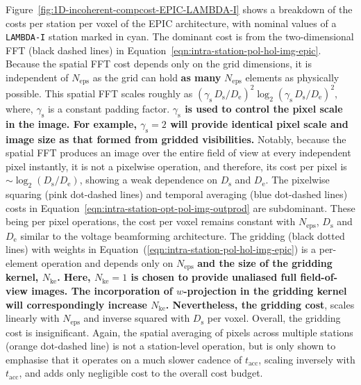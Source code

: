 \documentclass[
  journal=pasa,
  manuscript=article-type,
  year=2020,
  volume=37,
]{cup-journal}
\begin{document}
Figure~\ref{fig:1D-incoherent-compcost-EPIC-LAMBDA-I} shows a breakdown of the costs per station per voxel of the EPIC architecture, with nominal values of a \texttt{LAMBDA-I} station marked in cyan. The dominant cost is from the two-dimensional FFT (black dashed lines) in Equation~\ref{eqn:intra-station-pol-hol-img-epic}.
Because the spatial FFT cost depends only on the grid dimensions, it is independent of $N_\textrm{eps}$ as the grid can hold \textbf{as many} $N_\textrm{eps}$ elements as physically possible. This spatial FFT scales roughly as $(\gamma_\textrm{s} \, D_\textrm{s}/D_\textrm{e})^2\log_2(\gamma_\textrm{s}\, D_\textrm{s}/D_\textrm{e})^2$, where, $\gamma_\textrm{s}$ is a constant padding factor. \textbf{$\gamma_\textrm{s}$ is used to control the pixel scale in the image. For example, $\gamma_\textrm{s}=2$ will provide identical pixel scale and image size as that formed from gridded visibilities.} Notably, because the spatial FFT produces an image over the entire field of view at every independent pixel instantly, it is not a pixelwise operation, and therefore, its cost per pixel is $\sim \log_2(D_\textrm{s}/D_\textrm{e})$, showing a weak dependence on $D_\textrm{s}$ and $D_\textrm{e}$. The pixelwise squaring (pink dot-dashed lines) and temporal averaging (blue dot-dashed lines) costs in Equation~\ref{eqn:intra-station-opt-pol-img-outprod}
are subdominant. These being per pixel operations, the cost per voxel remains constant with $N_\textrm{eps}$, $D_\textrm{s}$ and $D_\textrm{e}$ similar to the voltage beamforming architecture. The gridding (black dotted lines) with weights in Equation~(\ref{eqn:intra-station-pol-hol-img-epic})
is a per-element operation and depends only on $N_\textrm{eps}$ \textbf{and the size of the gridding kernel, $N_\textrm{ke}$. Here, $N_\textrm{ke}=1$ is chosen to provide unaliased full field-of-view images. The incorporation of $w$-projection in the gridding kernel will correspondingly increase $N_\textrm{ke}$. Nevertheless, the gridding cost}, scales linearly with $N_\textrm{eps}$ and inverse squared with $D_\textrm{s}$ per voxel. Overall, the gridding cost is insignificant. Again, the spatial averaging of pixels across multiple stations (orange dot-dashed line) is not a station-level operation, but is only shown to emphasise that it operates on a much slower cadence of $t_\textrm{acc}$, scaling inversely with $t_\textrm{acc}$, and adds only negligible cost to the overall cost budget. 
\end{document}
